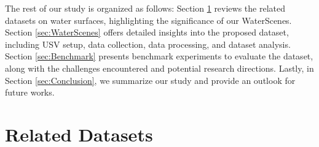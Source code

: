 \documentclass[lettersize,journal]{IEEEtran}
\begin{document}
The rest of our study is organized as follows: 
Section \ref{sec:Related Datasets} reviews the related datasets on water surfaces, highlighting the significance of our WaterScenes.
Section \ref{sec:WaterScenes} offers detailed insights into the proposed dataset, including USV setup, data collection, data processing, and dataset analysis.
Section \ref{sec:Benchmark} presents benchmark experiments to evaluate the dataset, along with the challenges encountered and potential research directions.
Lastly, in Section \ref{sec:Conclusion}, we summarize our study and provide an outlook for future works.


\section{Related Datasets}
\label{sec:Related Datasets}
\end{document}
